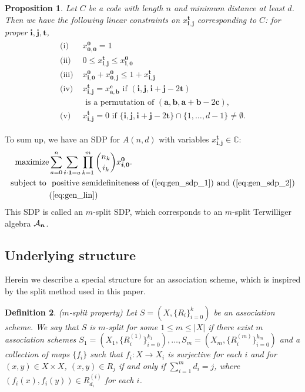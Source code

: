 \documentclass[final,onecolumn]{IEEEtran}
\newtheorem{definitionenv}{Definition}
\newtheorem{propositionenv}[definitionenv]{Proposition}
\newenvironment{definition}{\begin{definitionenv}\rm}{\end{definitionenv}}
\newenvironment{proposition}{\begin{propositionenv}\rm}{\end{propositionenv}}
\theoremstyle{definition}
\newcommand{\bmo}{{\bm 0}}
\newcommand{\bml}{{\bm 1}}
\newcommand{\bma}{{\bm a}}
\newcommand{\bmb}{{\bm b}}
\newcommand{\bmc}{{\bm c}}
\newcommand{\bmi}{{\bm i}}
\newcommand{\bmj}{{\bm j}}
\newcommand{\bmn}{{\bm n}}
\newcommand{\bmt}{{\bm t}}
\begin{document}
	
	
\begin{proposition}
    Let $C$ be a code with length $n$ and minimum distance at least $d$. Then we have the following linear constraints on $x_{\bmi, \bmj}^{\bmt}$ corresponding to $C$: for proper $\bmi, \bmj, \bmt$,
	\begin{align}
		\label{eq:gen_lin}
		\begin{array}{cl}
		    \mbox{(i) }& x_{\bmo, \bmo}^{\bmo} = 1 \\
			\mbox{(ii) }& 0 \leq x_{\bmi, \bmj}^{\bmt} \leq x_{\bmi, \bmo}^{\bmo} \\
			\mbox{(iii) }& x_{\bmi, \bmo}^{\bmo} + x_{\bmo, \bmj}^{\bmo} \leq 1 + x_{\bmi, \bmj}^{\bmt} \\
			\mbox{(iv) }& x_{\bmi, \bmj}^{\bmt} = x_{\bma, \bmb}^{\bmc} \mbox{ if } (\bmi, \bmj, \bmi+\bmj-2\bmt)  \\
			&\mbox{ is a permutation of } (\bma, \bmb, \bma+\bmb-2\bmc),  \\
			\mbox{(v) }&  x_{\bmi, \bmj}^{\bmt} = 0 \mbox{ if } \{\bmi, \bmj, \bmi+\bmj-2\bmt\} \cap \{1, \dots, d-1\} \neq \emptyset. 
		\end{array}
	\end{align}
\end{proposition}
	
To sum up, we have an SDP for $A(n, d)$  with variables $x_{\bmi, \bmj}^{\bmt} \in \mathbb{C}$:
\begin{align}
	{\rm maximize } &\sum_{a = 0}^{n} \sum_{\bmi \cdot \bml = a} \prod_{k = 1}^{m} \binom{n_{k}}{i_{k}} x_{\bmi, \bmo}^{\bmo}.  \notag\\
	{\rm subject\ to\ }       &  \mbox{ positive semidefiniteness of }(\ref{eq:gen_sdp_1}) \text{ and } (\ref{eq:gen_sdp_2}) \notag
	\\ & (\ref{eq:gen_lin})   \notag
\end{align}
This SDP is called an $m$-split SDP, which corresponds to an $m$-split Terwilliger algebra ${\cal A}_{\bmn}$.


	
\subsection{Underlying structure}
\label{sec:struct}
	
Herein we describe a special structure for an association scheme, which is inspired by the split method used in this paper.

	
\begin{definition}($m$-split property)
	Let $S = (X, \{R_{i}\}_{i=0}^{k})$ be an association scheme. We say that $S$  is \textit{$m$-split}  for some $1 \leq m \leq \lvert X\rvert$ if there exist $m$ association schemes $S_{1} = (X_{1}, \{R_{i}^{(1)}\}_{i=0}^{k_{1}}), \dots, S_{m} = (X_{m}, \{R_{i}^{(m)}\}_{i=0}^{k_{m}})$ and a collection of maps $\{f_{i}\}$ such that $f_{i}: X \longrightarrow X_{i}$ is surjective for each $i$ and for $(x, y) \in X \times X$, $(x, y) \in R_{j}$ if and only if $\sum_{i = 1}^{m} d_{i} = j$, where $(f_{i}(x), f_{i}(y)) \in R_{d_{i}}^{(i)}$ for each $i$. 
\end{definition}
		
\end{document}
